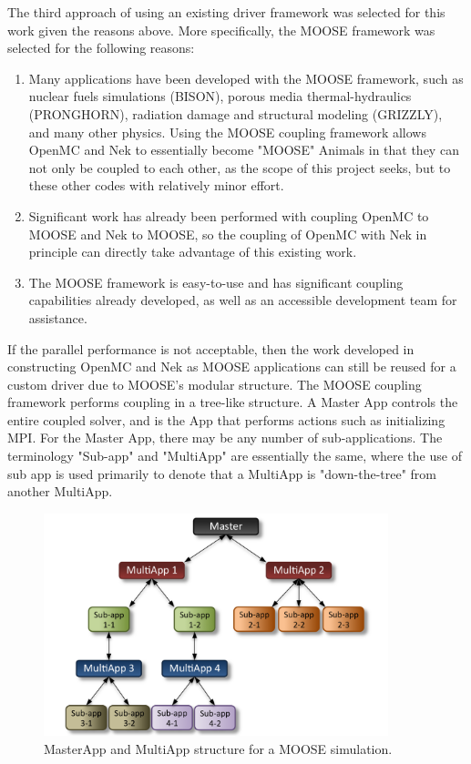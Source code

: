 \documentclass[10pt]{article}
\numberwithin{equation}{section} %
\begin{document}
The third approach of using an existing driver framework was selected for this work given the reasons above. More specifically, the MOOSE framework was selected for the following reasons:

\begin{enumerate}
\item Many applications have been developed with the MOOSE framework, such as nuclear fuels simulations (BISON), porous media thermal-hydraulics (PRONGHORN), radiation damage and structural modeling (GRIZZLY), and many other physics. Using the MOOSE coupling framework allows OpenMC and Nek to essentially become "MOOSE" Animals in that they can not only be coupled to each other, as the scope of this project seeks, but to these other codes with relatively minor effort.
\item Significant work has already been performed with coupling OpenMC to MOOSE and Nek to MOOSE, so the coupling of OpenMC with Nek in principle can directly take advantage of this existing work.
\item The MOOSE framework is easy-to-use and has significant coupling capabilities already developed, as well as an accessible development team for assistance.
\end{enumerate}

If the parallel performance is not acceptable, then the work developed in constructing OpenMC and Nek as MOOSE applications can still be reused for a custom driver due to MOOSE's modular structure. The MOOSE coupling framework performs coupling in a tree-like structure. A Master App controls the entire coupled solver, and is the App that performs actions such as initializing MPI. For the Master App, there may be any number of sub-applications. The terminology "Sub-app" and "MultiApp" are essentially the same, where the use of sub app is used primarily to denote that a MultiApp is "down-the-tree" from another MultiApp. 

\begin{figure}[H]
\centering
\includegraphics[width=10cm]{multiapp_hierarchy.png}
\caption{MasterApp and MultiApp structure for a MOOSE simulation.}
\end{figure}
\end{document}
